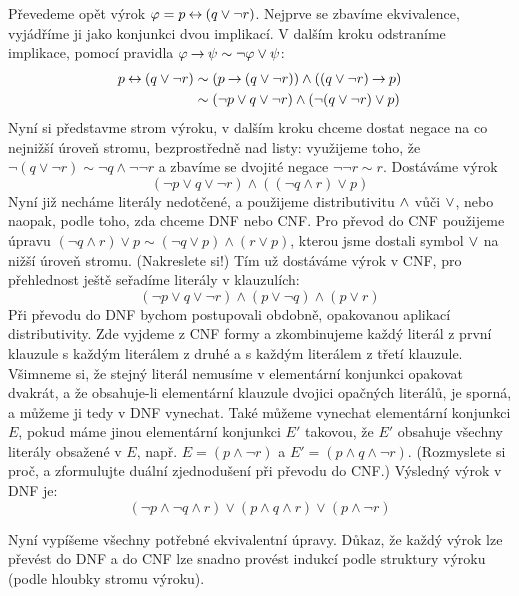 \begin{example}
    Převedeme opět výrok $\varphi=p\mathbin{\leftrightarrow} (q\lor \neg r)$. Nejprve se zbavíme ekvivalence, vyjádříme ji jako konjunkci dvou implikací. V dalším kroku odstraníme implikace, pomocí pravidla $\varphi\mathbin{\rightarrow}\psi\sim\neg\varphi\lor\psi$:
    \begin{align*}
        p\mathbin{\leftrightarrow} (q\lor \neg r) &\sim (p\mathbin{\rightarrow} (q\lor \neg r)) \land ((q\lor \neg r) \mathbin{\rightarrow} p)\\
        &\sim (\neg p\lor q\lor \neg r) \land (\neg (q\lor \neg r) \lor p)
    \end{align*}
    Nyní si představme strom výroku, v dalším kroku chceme dostat negace na co nejnižší úroveň stromu, bezprostředně nad listy: využijeme toho, že $\neg (q\lor \neg r)\sim \neg q\land \neg\neg r$ a zbavíme se dvojité negace $\neg\neg r\sim r$. Dostáváme výrok
    $$
    (\neg p\lor q\lor \neg r) \land ( (\neg q\land r) \lor p)
    $$
    Nyní již necháme literály nedotčené, a použijeme distributivitu ${\land}$ vůči ${\lor}$, nebo naopak, podle toho, zda chceme DNF nebo CNF. Pro převod do CNF použijeme úpravu $(\neg q\land r) \lor p\sim (\neg q\lor p)\land (r \lor p) $, kterou jsme dostali symbol ${\lor}$ na nižší úroveň stromu. (Nakreslete si!) Tím už dostáváme výrok v CNF, pro přehlednost ještě seřadíme literály v klauzulích:
    $$
    (\neg p\lor q\lor \neg r) \land (p\lor \neg q) \land (p \lor r)
    $$
    Při převodu do DNF bychom postupovali obdobně, opakovanou aplikací distributivity. Zde vyjdeme z CNF formy a zkombinujeme každý literál z první klauzule s každým literálem z druhé a s každým literálem z třetí klauzule. Všimneme si, že stejný literál nemusíme v elementární konjunkci opakovat dvakrát, a že obsahuje-li elementární klauzule dvojici opačných literálů, je sporná, a můžeme ji tedy v DNF vynechat. Také můžeme vynechat elementární konjunkci $E$, pokud máme jinou elementární konjunkci $E'$ takovou, že $E'$ obsahuje všechny literály obsažené v $E$, např. $E=(p\land \neg r)$ a $E'=(p\land q \land \neg r)$. (Rozmyslete si proč, a zformulujte duální zjednodušení při převodu do CNF.) Výsledný výrok v DNF je:
    $$
    (\neg p \land \neg q\land r) \lor (p\land q \land r) \lor (p\land \neg r)
    $$
\end{example}

Nyní vypíšeme všechny potřebné ekvivalentní úpravy. Důkaz, že každý výrok lze převést do DNF a do CNF lze snadno provést indukcí podle struktury výroku (podle hloubky stromu výroku).

